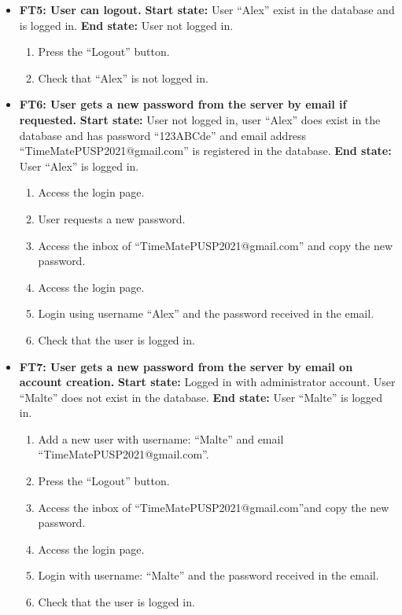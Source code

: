 \documentclass{article}
\begin{document}
\begin{itemize}
		\item \textbf{FT5: User can logout.} \newline
		\textbf{Start state:} User “Alex” exist in the database and is logged in. \newline
		\textbf{End state:} User not logged in.   
		\begin{enumerate}
			\item Press the “Logout” button. 
			\item Check that “Alex” is not logged in. 
		\end{enumerate}
		
		\item \textbf{FT6: User gets a new password from the server by email if requested.} \newline
		\textbf{Start state:} User not logged in, user “Alex” does exist in the database and has password “123ABCde” and email address “TimeMatePUSP2021@gmail.com” is registered in the database.\newline
		\textbf{End state:}  User “Alex” is logged in.  
		\begin{enumerate}
			\item Access the login page. 
			\item User requests a new password.
			\item Access the inbox of “TimeMatePUSP2021@gmail.com” and copy the new password.
			\item Access the login page.
			\item Login using username “Alex” and the password received in the email.
			\item Check that the user is logged in. 
		\end{enumerate}
		
		\item \textbf{FT7: User gets a new password from the server by email on account creation. } \newline
		\textbf{Start state:} Logged in with administrator account. User “Malte” does not exist in the database.  \newline
		\textbf{End state:}  User “Malte” is logged in.  
		\begin{enumerate}
			\item Add a new user with username: “Malte” and email “TimeMatePUSP2021@gmail.com”.
			\item Press the “Logout” button. 
			\item Access the inbox of “TimeMatePUSP2021@gmail.com”and copy the new password.
			\item Access the login page.
			\item Login with username: “Malte” and the password received in the email.
			\item Check that the user is logged in.
		\end{enumerate}
		

\end{itemize}
\end{document}
